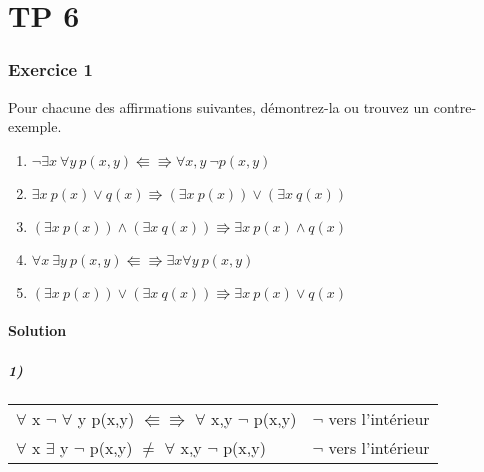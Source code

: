 \chapter*{TP 6}

\subsection*{Exercice 1}
Pour chacune des affirmations suivantes, démontrez-la ou trouvez un contre-exemple.
\begin{enumerate}
	\item $\neg \exists x \ \forall y \ p(x, y) \Lleftarrow\!\!\!\!\Rrightarrow \forall x, y \ \neg p(x, y)$
	\item $\exists x \ p(x) \vee q(x) \Rrightarrow (\exists x \ p(x)) \vee (\exists x \ q(x))$
	\item $(\exists x \ p(x)) \wedge (\exists x \ q(x)) \Rrightarrow \exists x \ p(x) \wedge q(x)$
	\item $\forall x \ \exists y \ p(x, y) \Lleftarrow\!\!\!\!\Rrightarrow \exists x \forall y \ p(x, y)$
	\item $(\exists x \ p(x)) \vee (\exists x \ q(x)) \Rrightarrow \exists x \ p(x) \vee q(x)$
\end{enumerate}

    \subsubsection*{Solution}
  
    \paragraph{1)}  
        \begin{tabular}{|l|l|}
        \hline
        $\forall$ x $\neg$ $\forall$ y p(x,y) $\Lleftarrow \Rrightarrow$ $\forall$ x,y $\neg$ p(x,y) & $\neg$ vers l'intérieur\\
        $\forall$ x $\exists$ y $\neg$ p(x,y) $\ne$ $\forall$ x,y $\neg$ p(x,y)& $\neg$ vers l'intérieur\\
        \hline
        \end{tabular}
    
